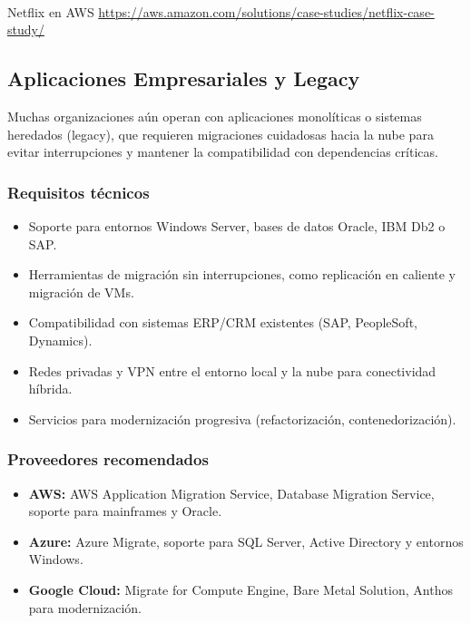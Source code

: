 {                \paragraph{} Netflix en AWS \href{https://aws.amazon.com/solutions/case-studies/netflix-case-study/}{https://aws.amazon.com/solutions/case-studies/netflix-case-study/}
                
        \subsection{Aplicaciones Empresariales y Legacy}
            Muchas organizaciones aún operan con aplicaciones monolíticas o sistemas heredados (legacy), que requieren migraciones cuidadosas hacia la nube para evitar interrupciones y mantener la compatibilidad con dependencias críticas.
            
            \subsubsection{Requisitos técnicos}
                \begin{itemize}
                    \item Soporte para entornos Windows Server, bases de datos Oracle, IBM Db2 o SAP.
                    \item Herramientas de migración sin interrupciones, como replicación en caliente y migración de VMs.
                    \item Compatibilidad con sistemas ERP/CRM existentes (SAP, PeopleSoft, Dynamics).
                    \item Redes privadas y VPN entre el entorno local y la nube para conectividad híbrida.
                    \item Servicios para modernización progresiva (refactorización, contenedorización).
                \end{itemize}
                
            \subsubsection{Proveedores recomendados}
                \begin{itemize}
                    \item \textbf{AWS:} AWS Application Migration Service, Database Migration Service, soporte para mainframes y Oracle.
                    \item \textbf{Azure:} Azure Migrate, soporte para SQL Server, Active Directory y entornos Windows.
                    \item \textbf{Google Cloud:} Migrate for Compute Engine, Bare Metal Solution, Anthos para modernización.
                \end{itemize}
                
}
